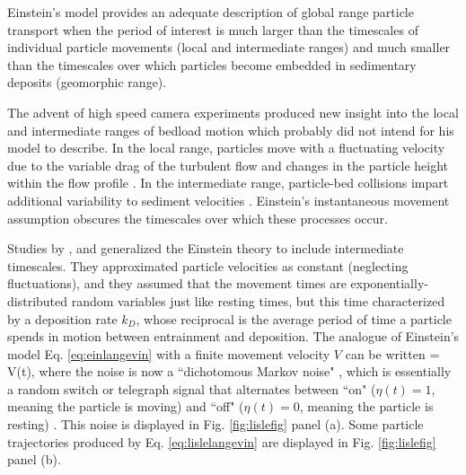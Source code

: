 Einstein's model provides an adequate description of global range particle transport when the period of interest is much larger than the timescales of individual particle movements (local and intermediate ranges) and much smaller than the timescales over which particles become embedded in sedimentary deposits (geomorphic range).

The advent of high speed camera experiments produced new insight into the local and intermediate ranges of bedload motion \citep{Abbott1977,Francis1973,Drake1988} which \citet{Einstein1937} probably did not intend for his model to describe.
In the local range, particles move with a fluctuating velocity due to the variable drag of the turbulent flow \citep{Lajeunesse2010,Fathel2015} and changes in the particle height within the flow profile \citep{VanRijn1984,Wiberg1985}.
In the intermediate range, particle-bed collisions impart additional variability to sediment velocities \citep{Gordon1972,Martin2013}.
Einstein's instantaneous movement assumption obscures the timescales over which these processes occur.

Studies by \citet{Lisle1998}, and \citet{Lajeunesse2017} generalized the Einstein theory to include intermediate timescales. They approximated particle velocities as constant (neglecting fluctuations), and they assumed that the movement times are exponentially-distributed random variables just like resting times, but this time characterized by a deposition rate $k_D$, whose reciprocal is the average period of time a particle spends in motion between entrainment and deposition.
The analogue of Einstein's model Eq. \ref{eq:einlangevin} with a finite movement velocity $V$ can be written
\be {} = V\eta(t), \label{eq:lislelangevin}\ee
where the noise is now a ``dichotomous Markov noise" \citep{VanDenBroeck1990,Bena2006}, which is essentially a random switch or telegraph signal that alternates between ``on" ($\eta(t) = 1$, meaning the particle is moving) and ``off" ($\eta(t) = 0$, meaning the particle is resting) \citep{Cox1965,Horsthemke1984, Masoliver1991, Masoliver1996}.
This noise is displayed in Fig. \ref{fig:lislefig} panel (a). Some particle trajectories produced by Eq. \ref{eq:lislelangevin} are displayed in Fig. \ref{fig:lislefig} panel (b).

